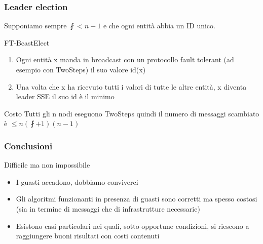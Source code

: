 		\begin{frame}
			\frametitle{Leader election}
			Supponiamo sempre $\fint < n - 1$ e che ogni entità abbia un ID unico.
			\begin{block}{FT-BcastElect}
				\begin{enumerate}
					\item Ogni entità x manda in broadcast con un protocollo fault tolerant (ad esempio con TwoSteps) il suo valore id(x)
					\item Una volta che x ha ricevuto tutti i valori di tutte le altre entità, x diventa leader SSE il suo id è il minimo
				\end{enumerate}			
			\end{block}
			\begin{block}{Costo}
				Tutti gli n nodi eseguono TwoSteps quindi il numero di messaggi scambiato è $\leq n(\fint+1)(n-1)$
			\end{block}
		\end{frame}
	
		\begin{frame}
			\frametitle{Conclusioni}
			\begin{block}{Difficile ma non impossibile}
				\begin{itemize}
					\item I guasti accadono, dobbiamo conviverci
					\item Gli algoritmi funzionanti in presenza di guasti sono corretti ma spesso costosi (sia in termine di messaggi che di infrastrutture necessarie)
					\item Esistono casi particolari nei quali, sotto opportune condizioni, si riescono a raggiungere buoni risultati con costi contenuti
				\end{itemize}	
			\end{block}
		\end{frame}